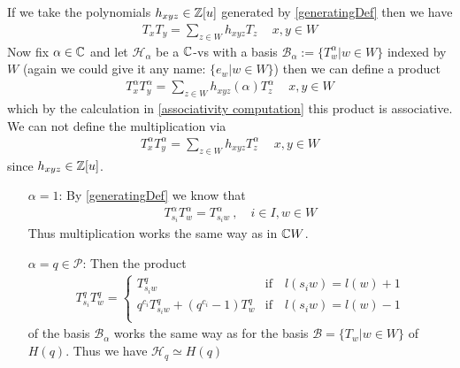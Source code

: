 \documentclass[]{article}
\begin{document}
\begin{remark}
    If we take the polynomials \(h_{xyz} \in {\mathbb{Z}}[u]\) generated by \eqref{generatingDef} then we have 
    \begin{align*}
        T_x T_y = \sum_{z \in W}^{}h_{xyz}T_z \, \quad x,y \in W
    \end{align*}
    Now fix \(\alpha \in {\mathbb{C}}\) and let \(\mathscr{H}_\alpha\) be a \({\mathbb{C}}\)-vs with a basis 
    \(\mathscr{B}_\alpha:=\{T^\alpha_w | w \in W\}\) indexed by \(W\) (again we could give it any name: \(\{e_w | w \in W\}\))
    then we can define a product 
    \begin{align*}
        T^\alpha_x T^\alpha_y = \sum_{z \in W}^{}h_{xyz}(\alpha)T^\alpha_z \, \quad x,y \in W
    \end{align*}
    which by the calculation in \eqref{associativity computation} this product is associative. 
    We can not define the multiplication via
    \begin{align*}
        T^\alpha_x T^\alpha_y = \sum_{z \in W}^{}h_{xyz}T^\alpha_z \, \quad x,y \in W
    \end{align*}
    since \(h_{xyz} \in {\mathbb{Z}}[u]\). 

    \begin{itemize}
        \item[\(\alpha = 1\):] By \eqref{generatingDef} we know that
        \begin{align*}
            T^\alpha_{s_i} T^\alpha_w = T^\alpha_{s_i w} \ , \quad i \in I, w \in W
        \end{align*}
        Thus multiplication works the same way as in \({\mathbb{C}} W\).
        \item[\(\alpha = q \in \mathscr{P}\):] Then the product
        \begin{align*}
            T^q_{s_i} T^q_w =
            \begin{cases}
                T^q_{s_i w}& \text{if} \quad l(s_i w) = l(w) +1 \\
                q^{c_i}T^q_{s_i w}+(q^{c_i}-1)T^q_w & \text{if} \quad l(s_i w)= l(w)-1 \\
            \end{cases}
        \end{align*}
        of the basis \(\mathscr{B}_\alpha\) works the same way as for the basis \(\mathscr{B}= \{T_w | w \in W\}\) of \(H(q)\).
        Thus we have \( \mathscr{H}_q\simeq H(q)\)
    \end{itemize}
\end{remark}
\end{document}
